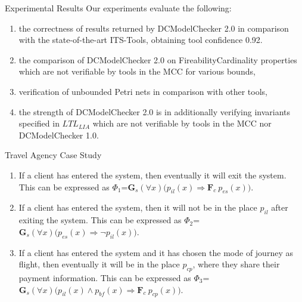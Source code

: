 \documentclass [serif,professionalfont]{beamer}
\newcommand{\LC}{$LTL_{LIA}$}
\begin{document}
\begin{frame}{Experimental Results}
    Our experiments evaluate the following:
    \begin{enumerate}
        \item  the correctness of results returned by DCModelChecker 2.0 in comparison with the state-of-the-art ITS-Tools, obtaining tool confidence 0.92.
        \item  the comparison of DCModelChecker 2.0 on FireabilityCardinality properties which are not verifiable by tools in the MCC for various bounds,
        \item verification of unbounded Petri nets in comparison with other tools,
        \item the strength of DCModelChecker 2.0 is in additionally verifying invariants specified in {\LC} which are not verifiable by tools in the MCC nor DCModelChecker 1.0.
    \end{enumerate}
\end{frame}


\begin{frame}{\tiny Travel Agency Case Study}
    \begin{figure}
        \centering
        \scalebox{0.3}{}
    \end{figure}
\end{frame}

\begin{frame}
    \begin{enumerate}
        \item[1] If a client has entered the system, then eventually it will exit the system. This can be expressed as $\Phi_1$=$\mathbf{G}_s(\forall x) \big( p_{il}(x) \Rightarrow \mathbf{F}_c~p_{es}(x) \big)$.
        \item[2]  If a client has entered the system, then it will not be in the place $p_{il}$ after exiting the system. This can be expressed as $\Phi_2$=$\mathbf{G}_s(\forall x) \big( p_{es}(x) \Rightarrow \neg p_{il}(x) \big)$.
        \item[3]  If a client has entered the system and it has chosen the mode of journey as flight, then eventually it will be in the place $p_{cp}$, where they share their payment information. This can be expressed as $\Phi_3$=$\mathbf{G}_s(\forall x) \big( p_{il}(x) \land p_{bf}(x)\Rightarrow \mathbf{F}_c~p_{cp}(x) \big)$.

    \end{enumerate}
\end{frame}
\end{document}
